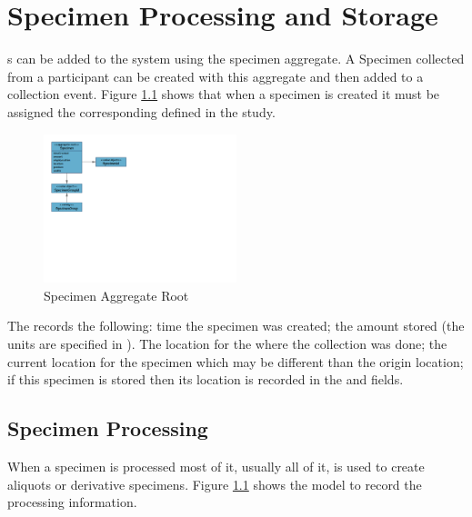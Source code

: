 \chapter{Specimen Processing and Storage}
\label{chap:specimen-processing}

s can be added to the system using the specimen
aggregate. A Specimen collected from a participant can be created with this
aggregate and then added to a collection event. Figure
\ref{fig:specimen-aggregate} shows that when a specimen is created it must be
assigned the corresponding  defined in the study.

\begin{figure}[H]
  \centering
  \includegraphics[trim={10mm 102mm 158mm 10mm}, clip,
    width=0.5\textwidth]{images/specimen-aggregate}
  \caption{Specimen Aggregate Root}
  \label{fig:specimen-aggregate}
\end{figure}

The  records the following: time the specimen was created;
the amount stored (the units are specified in ). The
location for the  where the collection was done; the current
location for the specimen which may be different than the origin location; if
this specimen is stored then its location is recorded in the
 and  fields.

\section{Specimen Processing}
When a specimen is processed most of it, usually all of it, is used to create
aliquots or derivative specimens. Figure \ref{fig:specimen-aggregate} shows the
model to record the processing information.

